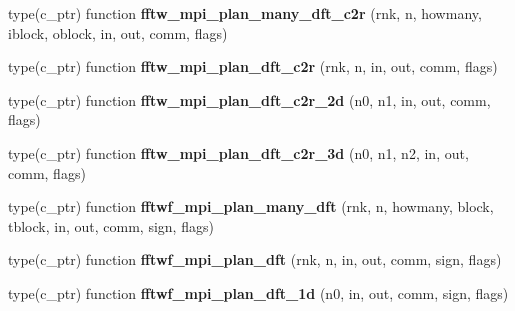 \begin{DoxyCompactItemize}
\item 
type(c\+\_\+ptr) function {\bfseries fftw\+\_\+mpi\+\_\+plan\+\_\+many\+\_\+dft\+\_\+c2r} (rnk, n, howmany, iblock, oblock, in, out, comm, flags)\hypertarget{interfacefftw3_1_1fftw__mpi__plan__gen_a8c06f79d94fa9a768595ee4c80c99d3a}{}\label{interfacefftw3_1_1fftw__mpi__plan__gen_a8c06f79d94fa9a768595ee4c80c99d3a}

\item 
type(c\+\_\+ptr) function {\bfseries fftw\+\_\+mpi\+\_\+plan\+\_\+dft\+\_\+c2r} (rnk, n, in, out, comm, flags)\hypertarget{interfacefftw3_1_1fftw__mpi__plan__gen_aeba12461e6d2d17c4ccd8dbb5e727fab}{}\label{interfacefftw3_1_1fftw__mpi__plan__gen_aeba12461e6d2d17c4ccd8dbb5e727fab}

\item 
type(c\+\_\+ptr) function {\bfseries fftw\+\_\+mpi\+\_\+plan\+\_\+dft\+\_\+c2r\+\_\+2d} (n0, n1, in, out, comm, flags)\hypertarget{interfacefftw3_1_1fftw__mpi__plan__gen_aadeee7a46207e696320c7a2f4aa912a3}{}\label{interfacefftw3_1_1fftw__mpi__plan__gen_aadeee7a46207e696320c7a2f4aa912a3}

\item 
type(c\+\_\+ptr) function {\bfseries fftw\+\_\+mpi\+\_\+plan\+\_\+dft\+\_\+c2r\+\_\+3d} (n0, n1, n2, in, out, comm, flags)\hypertarget{interfacefftw3_1_1fftw__mpi__plan__gen_a613519afcd3d1668150eb94ab58bf1b5}{}\label{interfacefftw3_1_1fftw__mpi__plan__gen_a613519afcd3d1668150eb94ab58bf1b5}

\item 
type(c\+\_\+ptr) function {\bfseries fftwf\+\_\+mpi\+\_\+plan\+\_\+many\+\_\+dft} (rnk, n, howmany, block, tblock, in, out, comm, sign, flags)\hypertarget{interfacefftw3_1_1fftw__mpi__plan__gen_a0ad52295143e906a91ba06b28bb77ec8}{}\label{interfacefftw3_1_1fftw__mpi__plan__gen_a0ad52295143e906a91ba06b28bb77ec8}

\item 
type(c\+\_\+ptr) function {\bfseries fftwf\+\_\+mpi\+\_\+plan\+\_\+dft} (rnk, n, in, out, comm, sign, flags)\hypertarget{interfacefftw3_1_1fftw__mpi__plan__gen_aad1045632e796308a9c7085de8f5f227}{}\label{interfacefftw3_1_1fftw__mpi__plan__gen_aad1045632e796308a9c7085de8f5f227}

\item 
type(c\+\_\+ptr) function {\bfseries fftwf\+\_\+mpi\+\_\+plan\+\_\+dft\+\_\+1d} (n0, in, out, comm, sign, flags)\hypertarget{interfacefftw3_1_1fftw__mpi__plan__gen_a5496d6a17a3b2a80802547b5192e17a0}{}\label{interfacefftw3_1_1fftw__mpi__plan__gen_a5496d6a17a3b2a80802547b5192e17a0}


\end{DoxyCompactItemize}
